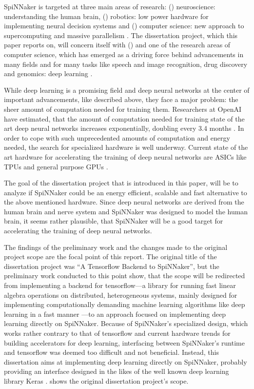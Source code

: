 \documentclass{article}
\begin{document}
SpiNNaker is targeted at three main areas of research:
() neuroscience: understanding the human
brain, () robotics: low power hardware for
implementing neural decision systems and
() computer science: new approach to
supercomputing and massive parallelism \citep{spinn_proj}.
The dissertation project, which this paper reports on,
will concern itself with () and one of the
research areas of computer science, which has emerged as
a driving force behind advancements in many fields and for
many tasks like speech and image recognition, drug
discovery and genomics: deep learning
\citep{lecun_et_al_2015}.

While deep learning is a promising field and deep neural
networks at the center of important advancements, like
described above, they face a major problem: the sheer
amount of computation needed for training them.
Researchers at OpenAI have estimated, that the amount of
computation needed for training state of the art deep
neural networks increases exponentially, doubling every
3.4 months \citep{openai2019}.
In order to cope with such unprecedented amounts of
computation and energy needed, the search for specialized
hardware is well underway.
Current state of the art hardware for accelerating the
training of deep neural networks are ASICs like TPUs and
general purpose GPUs \citep{tpus, mittal_et_al_2019}.

The goal of the dissertation project that is introduced in
this paper, will be to analyze if SpiNNaker could be an
energy efficient, scalable and fast alternative to the
above mentioned hardware.
Since deep neural networks are derived from the human
brain and nerve system \citep{goodfellow2016} and SpiNNaker
was designed to model the human brain, it seems rather
plausible, that SpiNNaker will be a good target for
accelerating the training of deep neural networks.

The findings of the preliminary work and the changes made
to the original project scope are the focal point of this
report.
The original title of the dissertation project was ``A
Tensorflow Backend to SpiNNaker'', but the preliminary work
conducted to this point show, that the scope will be
redirected from implementing a backend for tensorflow---a
library for running fast linear algebra operations on
distributed, heterogeneous systems, mainly designed for
implementing computationally demanding machine learning
algorithms like deep learning in a fast manner
\citep{tf2015}---to an approach focused on implementing
deep learning directly on SpiNNaker.
Because of SpiNNaker's specialized design, which works
rather contrary to that of tensorflow and current hardware
trends for building accelerators for deep learning,
interfacing between SpiNNaker's runtime and tensorflow was
deemed too difficult and not beneficial.
Instead, this dissertation aims at implementing deep
learning directly on SpiNNaker, probably providing an
interface designed in the likes of the well known deep
learning library Keras \citep{keras}.
\citet{proj} shows the original dissertation project's
scope.
\end{document}
